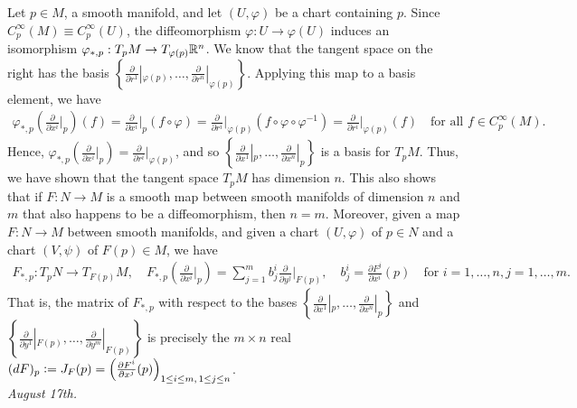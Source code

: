 Let $p \in M$, a smooth manifold, and let $(U,\varphi)$ be a chart containing $p$. Since $C_{p}^{\infty}(M) \equiv C_{p}^{\infty}(U)$, the diffeomorphism $\varphi:U \to \varphi(U)$ induces an isomorphism $\varphi_{\ast,p}:T_{p}M \to T_{\varphi(p)}\mathbb{R}^{n}$. We know that the tangent space on the right has the basis $\left\{\frac{\partial}{\partial r^{1}}|_{\varphi(p)},\ldots,\frac{\partial}{\partial r^{n}}|_{\varphi(p)}\right\}$. Applying this map to a basis element, we have
\begin{align}
    \varphi_{\ast,p}\left(\frac{\partial}{\partial x^{i}}\Big|_{p}\right)(f) = \frac{\partial}{\partial x^{i}}\Big|_{p}(f \circ \varphi) = \frac{\partial}{\partial r^{i}}\Big|_{\varphi(p)}(f \circ \varphi \circ \varphi^{-1}) = \frac{\partial}{\partial r^{i}}\Big|_{\varphi(p)}(f) \quad \text{for all } f \in C_{p}^{\infty}(M).
\end{align}
Hence, $\varphi_{\ast,p}\left(\frac{\partial}{\partial x^{i}}|_{p}\right) = \frac{\partial}{\partial r^{i}}|_{\varphi(p)}$, and so $\left\{\frac{\partial}{\partial x^{1}}|_{p},\ldots,\frac{\partial}{\partial x^{n}}|_{p}\right\}$ is a basis for $T_{p}M$. Thus, we have shown that the tangent space $T_{p}M$ has dimension $n$. This also shows that if $F:N \to M$ is a smooth map between smooth manifolds of dimension $n$ and $m$ that also happens to be a diffeomorphism, then $n = m$. Moreover, given a map $F:N \to M$ between smooth manifolds, and given a chart $(U,\varphi)$ of $p \in N$ and a chart $(V,\psi)$ of $F(p) \in M$, we have
\begin{align}
    F_{\ast,p}:T_{p}N \to T_{F(p)}M, \quad F_{\ast,p}\left(\frac{\partial}{\partial x^{i}}\Big|_{p}\right) = \sum_{j=1}^{m} b_{j}^{i} \frac{\partial}{\partial y^{j}}\Big|_{F(p)}, \quad b_{j}^{i} = \frac{\partial F^{j}}{\partial x^{i}}(p) \quad \text{for } i = 1,\ldots,n, j = 1,\ldots,m.
\end{align}
That is, the matrix of $F_{\ast,p}$ with respect to the bases $\left\{\frac{\partial}{\partial x^{1}}|_{p},\ldots,\frac{\partial}{\partial x^{n}}|_{p}\right\}$ and $\left\{\frac{\partial}{\partial y^{1}}|_{F(p)},\ldots,\frac{\partial}{\partial y^{m}}|_{F(p)}\right\}$ is precisely the $m \times n$ real  $(dF)_{p} \vcentcolon= J_{F}(p) = \left( \frac{\partial F^{i}}{\partial x^{j}}(p) \right)_{1 \leq i \leq m, \, 1 \leq j \leq n}$.
\\

\noindent \textit{August 17th.}


